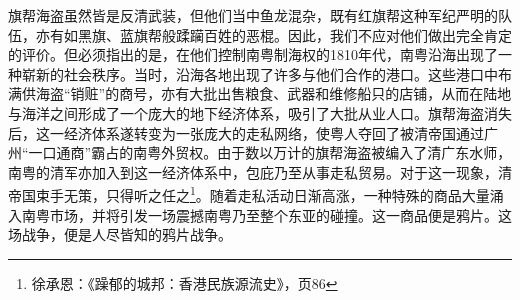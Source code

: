 旗帮海盗虽然皆是反清武装，但他们当中鱼龙混杂，既有红旗帮这种军纪严明的队伍，亦有如黑旗、蓝旗帮般蹂躏百姓的恶棍。因此，我们不应对他们做出完全肯定的评价。但必须指出的是，在他们控制南粤制海权的1810年代，南粤沿海出现了一种崭新的社会秩序。当时，沿海各地出现了许多与他们合作的港口。这些港口中布满供海盗“销赃”的商号，亦有大批出售粮食、武器和维修船只的店铺，从而在陆地与海洋之间形成了一个庞大的地下经济体系，吸引了大批从业人口。旗帮海盗消失后，这一经济体系遂转变为一张庞大的走私网络，使粤人夺回了被清帝国通过广州“一口通商”霸占的南粤外贸权。由于数以万计的旗帮海盗被编入了清广东水师，南粤的清军亦加入到这一经济体系中，包庇乃至从事走私贸易。对于这一现象，清帝国束手无策，只得听之任之\footnote{徐承恩：《躁郁的城邦：香港民族源流史》，页86}。随着走私活动日渐高涨，一种特殊的商品大量涌入南粤市场，并将引发一场震撼南粤乃至整个东亚的碰撞。这一商品便是鸦片。这场战争，便是人尽皆知的鸦片战争。













